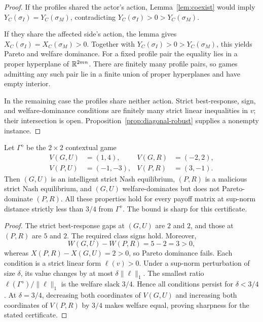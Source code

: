 \begin{proof}
If the profiles shared the actor's action, Lemma~\ref{lem:coexist} would imply $Y_C(\sigma_I)=Y_C(\sigma_M)$, contradicting $Y_C(\sigma_I)>0>Y_C(\sigma_M)$.

If they share the affected side's action, the lemma gives $X_C(\sigma_I)=X_C(\sigma_M)>0$. Together with $Y_C(\sigma_I)>0>Y_C(\sigma_M)$, this yields Pareto and welfare dominance. For a fixed profile pair the equality lies in a proper hyperplane of $\mathbb{R}^{2mn}$. There are finitely many profile pairs, so games admitting any such pair lie in a finite union of proper hyperplanes and have empty interior.

In the remaining case the profiles share neither action. Strict best-response, sign, and welfare-dominance conditions are finitely many strict linear inequalities in $v$; their intersection is open. Proposition~\ref{prop:diagonal-robust} supplies a nonempty instance.
\end{proof}

\begin{proposition}
\label{prop:diagonal-robust}
Let $\Gamma^\diamond$ be the $2\times2$ contextual game
\begin{align*}
V(G,U)&=(1,4), & V(G,R)&=(-2,2),\\
V(P,U)&=(-1,-3), & V(P,R)&=(3,-1).
\end{align*}
Then $(G,U)$ is an intelligent strict Nash equilibrium, $(P,R)$ is a malicious strict Nash equilibrium, and $(G,U)$ welfare-dominates but does not Pareto-dominate $(P,R)$. All these properties hold for every payoff matrix at sup-norm distance strictly less than $3/4$ from $\Gamma^\diamond$. The bound is sharp for this certificate.
\end{proposition}

\begin{proof}
The strict best-response gaps at $(G,U)$ are $2$ and $2$, and those at $(P,R)$ are $5$ and $2$. The required class signs hold. Moreover,
\[
W(G,U)-W(P,R)=5-2=3>0,
\]
whereas $X(P,R)-X(G,U)=2>0$, so Pareto dominance fails. Each condition is a strict linear form $\ell(v)>0$. Under a sup-norm perturbation of size $\delta$, its value changes by at most $\delta\|\ell\|_1$. The smallest ratio $\ell(\Gamma^\diamond)/\|\ell\|_1$ is the welfare slack $3/4$. Hence all conditions persist for $\delta<3/4$. At $\delta=3/4$, decreasing both coordinates of $V(G,U)$ and increasing both coordinates of $V(P,R)$ by $3/4$ makes welfare equal, proving sharpness for the stated certificate.
\end{proof}
